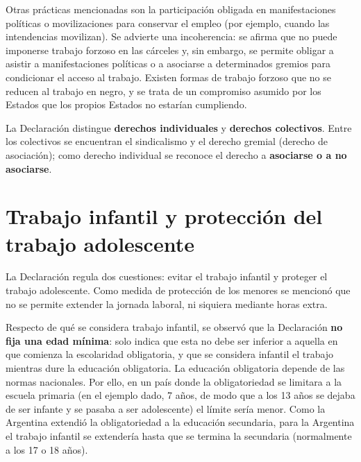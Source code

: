 \documentclass[12pt,oneside]{book}
\begin{document}
Otras prácticas mencionadas son la participación obligada en manifestaciones políticas o movilizaciones para conservar el empleo (por ejemplo, cuando las intendencias movilizan). Se advierte una incoherencia: se afirma que no puede imponerse trabajo forzoso en las cárceles y, sin embargo, se permite obligar a asistir a manifestaciones políticas o a asociarse a determinados gremios para condicionar el acceso al trabajo.
Existen formas de trabajo forzoso que no se reducen al trabajo en negro, y se trata de un compromiso asumido por los Estados que los propios Estados no estarían cumpliendo.

\begin{important}
La Declaración distingue \textbf{derechos individuales} y \textbf{derechos colectivos}. Entre los colectivos se encuentran el sindicalismo y el derecho gremial (derecho de asociación); como derecho individual se reconoce el derecho a \textbf{asociarse o a no asociarse}.
\end{important}

\section{Trabajo infantil y protección del trabajo adolescente}

La Declaración regula dos cuestiones: evitar el trabajo infantil y proteger el trabajo adolescente. Como medida de protección de los menores se mencionó que no se permite extender la jornada laboral, ni siquiera mediante horas extra.

Respecto de qué se considera trabajo infantil, se observó que la Declaración \textbf{no fija una edad mínima}: solo indica que esta no debe ser inferior a aquella en que comienza la escolaridad obligatoria, y que se considera infantil el trabajo mientras dure la educación obligatoria.
La educación obligatoria depende de las normas nacionales. Por ello, en un país donde la obligatoriedad se limitara a la escuela primaria (en el ejemplo dado, 7 años, de modo que a los 13 años se dejaba de ser infante y se pasaba a ser adolescente) el límite sería menor. Como la Argentina extendió la obligatoriedad a la educación secundaria, para la Argentina el trabajo infantil se extendería hasta que se termina la secundaria (normalmente a los 17 o 18 años).
\end{document}
